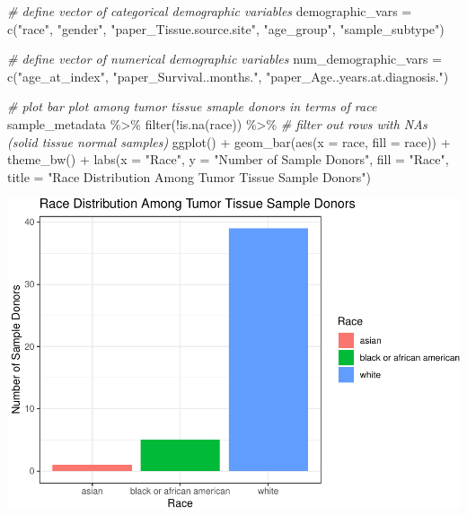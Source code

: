 \documentclass[
]{article}
\newenvironment{Shaded}{\begin{snugshade}}{\end{snugshade}}
\newcommand{\AttributeTok}[1]{\textcolor[rgb]{0.77,0.63,0.00}{#1}}
\newcommand{\CommentTok}[1]{\textcolor[rgb]{0.56,0.35,0.01}{\textit{#1}}}
\newcommand{\FunctionTok}[1]{\textcolor[rgb]{0.00,0.00,0.00}{#1}}
\newcommand{\NormalTok}[1]{#1}
\newcommand{\OtherTok}[1]{\textcolor[rgb]{0.56,0.35,0.01}{#1}}
\newcommand{\SpecialCharTok}[1]{\textcolor[rgb]{0.00,0.00,0.00}{#1}}
\newcommand{\StringTok}[1]{\textcolor[rgb]{0.31,0.60,0.02}{#1}}
\begin{document}
\begin{Shaded}
\begin{Highlighting}[]
\CommentTok{\# define vector of categorical demographic variables}
\NormalTok{demographic\_vars }\OtherTok{=} \FunctionTok{c}\NormalTok{(}\StringTok{"race"}\NormalTok{, }\StringTok{"gender"}\NormalTok{, }\StringTok{"paper\_Tissue.source.site"}\NormalTok{, }\StringTok{"age\_group"}\NormalTok{, }\StringTok{"sample\_subtype"}\NormalTok{)}

\CommentTok{\# define vector of numerical demographic variables}
\NormalTok{num\_demographic\_vars }\OtherTok{=} \FunctionTok{c}\NormalTok{(}\StringTok{"age\_at\_index"}\NormalTok{, }\StringTok{"paper\_Survival..months."}\NormalTok{, }\StringTok{"paper\_Age..years.at.diagnosis."}\NormalTok{)}

\CommentTok{\# plot bar plot among tumor tissue smaple donors in terms of race}
\NormalTok{sample\_metadata }\SpecialCharTok{\%\textgreater{}\%} 
  \FunctionTok{filter}\NormalTok{(}\SpecialCharTok{!}\FunctionTok{is.na}\NormalTok{(race)) }\SpecialCharTok{\%\textgreater{}\%} \CommentTok{\# filter out rows with NAs (solid tissue normal samples)}
  \FunctionTok{ggplot}\NormalTok{() }\SpecialCharTok{+}
  \FunctionTok{geom\_bar}\NormalTok{(}\FunctionTok{aes}\NormalTok{(}\AttributeTok{x =}\NormalTok{ race, }\AttributeTok{fill =}\NormalTok{ race)) }\SpecialCharTok{+}
  \FunctionTok{theme\_bw}\NormalTok{() }\SpecialCharTok{+}
  \FunctionTok{labs}\NormalTok{(}\AttributeTok{x =} \StringTok{"Race"}\NormalTok{, }\AttributeTok{y =} \StringTok{"Number of Sample Donors"}\NormalTok{, }\AttributeTok{fill =} \StringTok{"Race"}\NormalTok{,}
       \AttributeTok{title =} \StringTok{"Race Distribution Among Tumor Tissue Sample Donors"}\NormalTok{)}
\end{Highlighting}
\end{Shaded}

\includegraphics{LiuKevin_Final_Project_files/figure-latex/unnamed-chunk-5-1.pdf}
\end{document}
